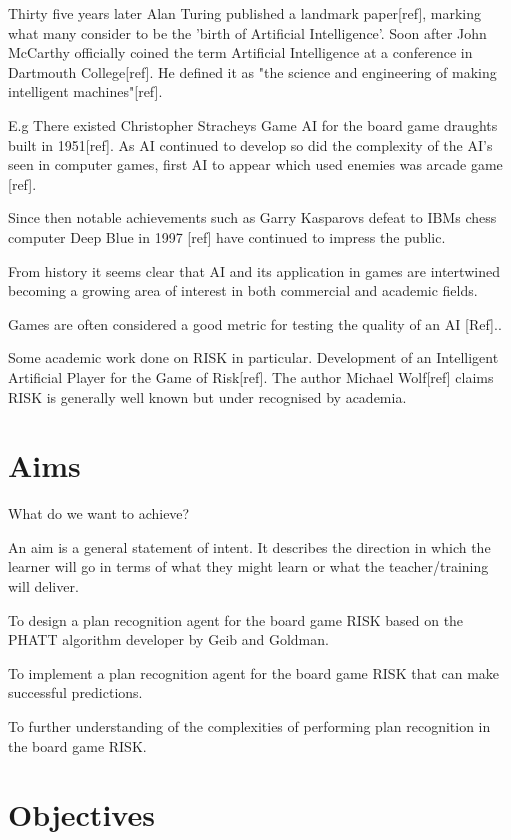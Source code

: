 \documentclass[parskip]{cs4rep}
\begin{document}
Thirty five years later Alan Turing published a landmark paper[ref], marking what many consider to be the 'birth of Artificial Intelligence'. Soon after John McCarthy officially coined the term Artificial Intelligence at a conference in Dartmouth College[ref]. He defined it as "the science and engineering of making intelligent machines"[ref].

E.g
There existed Christopher Stracheys Game AI for the board game draughts built in 1951[ref]. As AI continued to develop so did the complexity of the AI's seen in computer games, first AI to appear which used enemies was arcade game [ref].

Since then notable achievements such as Garry Kasparovs defeat to IBMs chess computer Deep Blue in 1997 [ref] have continued to impress the public. 

From history it seems clear that AI and its application in games are intertwined becoming a growing area of interest in both commercial and academic fields.

Games are often considered a good metric for testing the quality of an AI [Ref].. 

Some academic work done on RISK in particular. Development of an Intelligent Artificial Player for the Game of Risk[ref]. The author Michael Wolf[ref] claims RISK is generally well known but under recognised by academia.

\section{Aims}

What do we want to achieve?

An aim is a general statement of intent. It describes the direction in which the learner will go in terms of what they might learn or what the teacher/training will deliver.

To design a plan recognition agent for the board game RISK based on the PHATT algorithm developer by Geib and Goldman.

To implement a plan recognition agent for the board game RISK that can make successful predictions.

To further understanding of the complexities of performing plan recognition in the board game RISK.

\section{Objectives}
\end{document}
